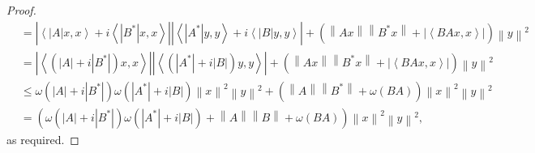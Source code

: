 \documentclass[10pt,a4paper]{amsart}
\begin{document}
\begin{proof}
\begin{align}
 & =\left| \left\langle \left| A \right|x,x \right\rangle +i\left\langle \left| {{B}^{*}} \right|x,x \right\rangle  \right|\left| \left\langle \left| {{A}^{*}} \right|y,y \right\rangle +i\left\langle \left| B \right|y,y \right\rangle  \right|+\left( \left\| Ax \right\|\left\| {{B}^{*}}x \right\|+\left| \left\langle BAx,x \right\rangle  \right| \right){{\left\| y \right\|}^{2}} \nonumber\\ 
 & =\left| \left\langle \left( \left| A \right|+i\left| {{B}^{*}} \right| \right)x,x \right\rangle  \right|\left| \left\langle \left( \left| {{A}^{*}} \right|+i\left| B \right| \right)y,y \right\rangle  \right|+\left( \left\| Ax \right\|\left\| {{B}^{*}}x \right\|+\left| \left\langle BAx,x \right\rangle  \right| \right){{\left\| y \right\|}^{2}} \label{3}\\ 
 & \le \omega \left( \left| A \right|+i\left| {{B}^{*}} \right| \right)\omega \left( \left| {{A}^{*}} \right|+i\left| B \right| \right){{\left\| x \right\|}^{2}}{{\left\| y \right\|}^{2}}+\left( \left\| A \right\|\left\| {{B}^{*}} \right\|+\omega \left( BA \right) \right){{\left\| x \right\|}^{2}}{{\left\| y \right\|}^{2}} \nonumber\\ 
 & =\left( \omega \left( \left| A \right|+i\left| {{B}^{*}} \right| \right)\omega \left( \left| {{A}^{*}} \right|+i\left| B \right| \right)+\left\| A \right\|\left\| B \right\|+\omega \left( BA \right) \right){{\left\| x \right\|}^{2}}{{\left\| y \right\|}^{2}}\nonumber,
\end{align}
as required.
\end{proof}
\end{document}
